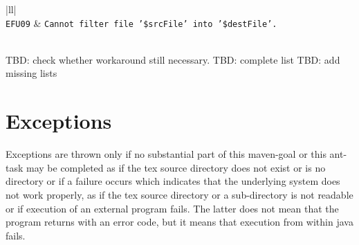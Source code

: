 \documentclass[12pt]{book}
\begin{document}
\begin{longtable}{|ll|}
 \\
\texttt{\footnotesize EFU09}  & \texttt{\footnotesize Cannot filter file '\$srcFile' into '\$destFile'. } \\
 \\
\end{longtable}
TBD\@: check whether workaround still necessary. 
TBD\@: complete list
TBD\@: add missing lists 


\section{Exceptions}\label{sec:exception}

Exceptions are thrown only if no substantial part of 
this maven-goal or this ant-task may be completed 
as if the tex source directory does not exist or is no directory 
or if a failure occurs which indicates 
that the underlying system does not work properly, 
as if the tex source directory or a sub-directory is not readable 
or if execution of an external program fails. 
The latter does not mean that the program returns with an error code, 
but it means that execution from within java fails.
\end{document}
